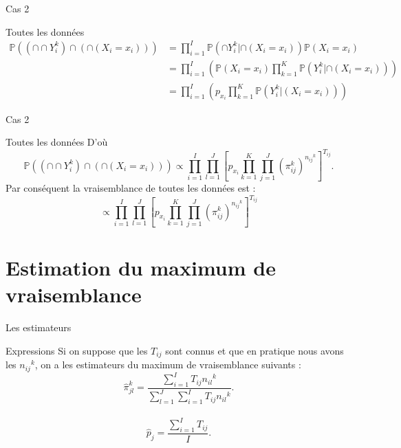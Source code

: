 \documentclass[11pt]{beamer}
\begin{document}
	\begin{frame}{Cas 2}
		\begin{block}{Toutes les données}
			\scriptsize
			\begin{align*}
				\mathbb{P} \left((\cap \cap Y_{i}^k) \cap \left(\cap(X_i=x_i)\right)  \right) &= \prod_{i=1}^{I} \mathbb{P} \left(\cap Y_{i}^k | \cap (X_i=x_i)\right) \mathbb{P}(X_i = x_i)\\
				&= \prod_{i=1}^{I}\left(\mathbb{P}(X_i = x_i) \prod_{k=1}^{K}\mathbb{P} \left( Y_{i}^k | \cap(X_i=x_i) \right)\right) \\
				&= \prod_{i=1}^{I}\left(p_{x_i} \prod_{k=1}^{K}\mathbb{P} \left( Y_{i}^k | (X_i=x_i) \right)\right)
			\end{align*}
			
		\end{block}
	\end{frame}	
	
	\begin{frame}{Cas 2}
		\begin{block}{Toutes les données}
			D'où \[\mathbb{P} \left((\cap \cap Y_{i}^k) \cap \left(\cap(X_i=x_i)\right)  \right) \propto \prod_{i=1}^{I}\prod_{l=1}^{J}\left[p_{x_i} \prod_{k=1}^{K} \prod_{j=1}^{J} \left(\pi_{ij}^k\right)^{{n_{ij}}^{k}}\right]^{T_{ij}}.\]
			Par conséquent la vraisemblance de toutes les données est :
			\[\propto \prod_{i=1}^{I}\prod_{l=1}^{J}\left[p_{x_i} \prod_{k=1}^{K} \prod_{j=1}^{J} \left(\pi_{ij}^k\right)^{{n_{ij}}^{k}}\right]^{T_{ij}}\]	
			
		\end{block}
	\end{frame}	
	
	\section{Estimation du maximum de vraisemblance}
	\begin{frame}{Les estimateurs}
		\begin{block}{Expressions}
			Si on suppose que les $T_{ij}$ sont connus et que en pratique nous avons les ${{n_{ij}}^{k}}$, on a les estimateurs du maximum de vraisemblance suivants :
			\[\hat{\pi}_{jl}^k = \frac{\sum_{i=1}^{I} T_{ij} {n_{il}}^{k}}{\sum_{l=1}^{J} \sum_{i=1}^{I}  T_{ij} {n_{il}}^{k}}.\]\\
			\[\hat{p}_j = \frac{\sum_{i=1}^{I} T_{ij}}{I}.\]
		\end{block}
	\end{frame}
\end{document}
